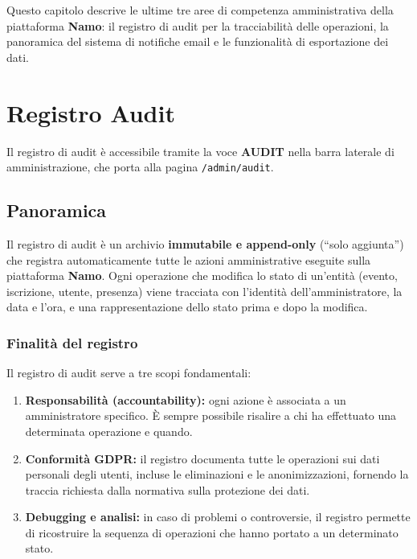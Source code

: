 \documentclass[a4paper,11pt,oneside]{book}
\newcommand{\namo}{\textbf{Namo}}
\newcommand{\menuitem}[1]{\textsf{\textbf{#1}}}
\newcommand{\percorso}[1]{\textcolor{namoCyan}{\texttt{#1}}}
\begin{document}
Questo capitolo descrive le ultime tre aree di competenza amministrativa della piattaforma \namo{}: il registro di audit per la tracciabilit\`a delle operazioni, la panoramica del sistema di notifiche email e le funzionalit\`a di esportazione dei dati.

\section{Registro Audit}
\label{sec:registro-audit}

Il registro di audit \`e accessibile tramite la voce \menuitem{AUDIT} nella barra laterale di amministrazione, che porta alla pagina \percorso{/admin/audit}.

\subsection{Panoramica}
\label{sec:audit-panoramica}

Il registro di audit \`e un archivio \textbf{immutabile e append-only} (``solo aggiunta'') che registra automaticamente tutte le azioni amministrative eseguite sulla piattaforma \namo{}. Ogni operazione che modifica lo stato di un'entit\`a (evento, iscrizione, utente, presenza) viene tracciata con l'identit\`a dell'amministratore, la data e l'ora, e una rappresentazione dello stato prima e dopo la modifica.

\subsubsection{Finalit\`a del registro}

Il registro di audit serve a tre scopi fondamentali:

\begin{enumerate}[leftmargin=1.5em]
  \item \textbf{Responsabilit\`a (accountability):} ogni azione \`e associata a un amministratore specifico. \`E sempre possibile risalire a chi ha effettuato una determinata operazione e quando.
  \item \textbf{Conformit\`a GDPR:} il registro documenta tutte le operazioni sui dati personali degli utenti, incluse le eliminazioni e le anonimizzazioni, fornendo la traccia richiesta dalla normativa sulla protezione dei dati.
  \item \textbf{Debugging e analisi:} in caso di problemi o controversie, il registro permette di ricostruire la sequenza di operazioni che hanno portato a un determinato stato.
\end{enumerate}
\end{document}
